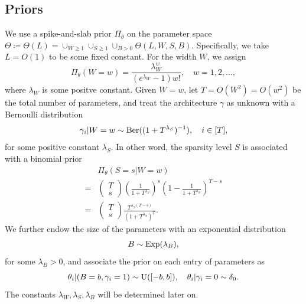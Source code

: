 \documentclass{article}
\theoremstyle{plain}
\theoremstyle{definition}
\theoremstyle{remark}
\begin{document}
\subsection{Priors} \label{prior_construction}
We use a  spike-and-slab prior $\Pi_\theta$ on the parameter space $\Theta \coloneqq \Theta(L) = \cup_{W \geq 1} \cup_{S \geq 1} \cup_{B > 0} \Theta(L, W, S, B)$. Specifically, we take $L = O(1)$ to be some fixed constant. For the width $W$, we assign
\begin{equation*}
    \Pi_\theta(W = w) = \frac{\lambda_W^w }{(e^{\lambda_W} - 1) w!}, \quad w = 1, 2, \ldots,
\end{equation*}
where $\lambda_W$ is some positve constant.  
Given $W=w$, let $T = O(W^2) = O(w^2)$ be the total number of parameters, and treat the architecture $\gamma$ as unknown with a Bernoulli distribution
\begin{equation*}
    \gamma_i| W=w \sim \textnormal{Ber}((1 + T^{\lambda_S})^{-1}), \quad i \in [T], 
\end{equation*}
for some positive constant $\lambda_S$.
In other word, the sparsity level $S$ is associated with a binomial prior
\begin{align*}
    & \Pi_\theta(S = s | W = w) \\ = & 
    \begin{pmatrix}
        T \\ s
    \end{pmatrix}
    \left(\frac{1}{1 + T^{\lambda_S}}\right)^s
    \left(1-\frac{1}{1 + T^{\lambda_S}}\right)^{T-s} \\  =& 
    \begin{pmatrix}
        T \\ s
    \end{pmatrix}
    \frac{T^{\lambda_S (T-s)}}{(1 + T^{\lambda_S})^T}. 
\end{align*}
We further endow the size of the parameters with an exponential distribution
\begin{align*}
     B \sim \textnormal{Exp}(\lambda_B),
\end{align*}
for some $\lambda_B > 0$, and associate the prior on each entry of parameters as 
\begin{equation*}
    \theta_i| (B = b, \gamma_i = 1) \sim \textnormal{U}([-b, b]), \quad \theta_i|\gamma_i=0 \sim \delta_0.
\end{equation*}
The constants $\lambda_W, \lambda_S, \lambda_B$ will be determined later on. 
\end{document}
